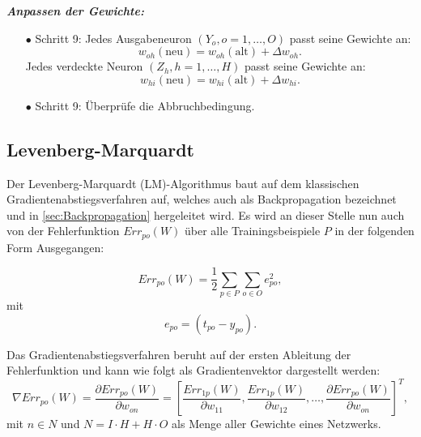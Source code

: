 \textbf{\textit{Anpassen der Gewichte:}}
\begin{itemize}
\item[\textbf{$\bullet$}] Schritt 9: Jedes Ausgabeneuron $(Y_{o}, o=1,\dots,O)$ passt seine Gewichte an: 
\begin{equation}
w_{oh}(\text{neu})=w_{oh}(\text{alt})+\Delta w_{oh}.
\end{equation}
Jedes verdeckte Neuron $(Z_{h}, h=1,\dots,H)$ passt seine Gewichte an:
\begin{equation}
w_{hi}(\text{neu})=w_{hi}(\text{alt})+\Delta w_{hi}.
\end{equation}

\item[\textbf{$\bullet$}] Schritt 9: Überprüfe die Abbruchbedingung.
\end{itemize}

\subsection{Levenberg-Marquardt}\label{sec:LM_herleitung}



Der Levenberg-Marquardt (LM)-Algorithmus baut auf dem klassischen Gradientenabstiegsverfahren auf, welches auch als Backpropagation bezeichnet und in \autoref{sec:Backpropagation} hergeleitet wird. Es wird an dieser Stelle nun auch von der Fehlerfunktion $Err_{po}(W)$ über alle Trainingsbeispiele $P$ in der folgenden Form Ausgegangen:

\begin{equation}
Err_{po}(W)= \frac{1}{2} \sum\limits_{p \in P} \sum\limits_{o \in O} e_{po}^2,
\label{gl:LM_fehler}
\end{equation}
mit
\begin{equation}
e_{po}=(t_{po}-y_{po}).
\end{equation}

Das Gradientenabstiegsverfahren beruht auf der ersten Ableitung der Fehlerfunktion und kann wie folgt als Gradientenvektor dargestellt werden:
\begin{equation}
\nabla Err_{po}(W)= \frac{\partial Err_{po}(W)}{\partial w_{on}}= \left [ \frac{Err_{1p}(W)}{\partial w_{11}} , \frac{Err_{1p}(W)}{\partial w_{12}}, \dots,  \frac{\partial Err_{po}(W)}{\partial w_{on}}  \right ]^T,
\label{gl:LM_bp_err}
\end{equation}
mit $n \in N$ und $N= I \cdot H + H \cdot O$ als Menge aller Gewichte eines Netzwerks.

